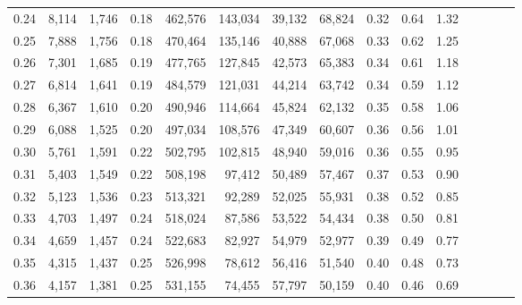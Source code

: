 \begin{tabular}{rrrcrrrrrrrrrrr}
0.24 &   8,114 &  1,746 &                                       0.18 &  462,576 &  143,034 &   39,132 &   68,824 &  0.32 &  0.64 &                         1.32 \\
0.25 &   7,888 &  1,756 &                                       0.18 &  470,464 &  135,146 &   40,888 &   67,068 &  0.33 &  0.62 &                         1.25 \\
0.26 &   7,301 &  1,685 &                                       0.19 &  477,765 &  127,845 &   42,573 &   65,383 &  0.34 &  0.61 &                         1.18 \\
0.27 &   6,814 &  1,641 &                                       0.19 &  484,579 &  121,031 &   44,214 &   63,742 &  0.34 &  0.59 &                         1.12 \\
0.28 &   6,367 &  1,610 &                                       0.20 &  490,946 &  114,664 &   45,824 &   62,132 &  0.35 &  0.58 &                         1.06 \\
0.29 &   6,088 &  1,525 &                                       0.20 &  497,034 &  108,576 &   47,349 &   60,607 &  0.36 &  0.56 &                         1.01 \\
0.30 &   5,761 &  1,591 &                                       0.22 &  502,795 &  102,815 &   48,940 &   59,016 &  0.36 &  0.55 &                         0.95 \\
0.31 &   5,403 &  1,549 &                                       0.22 &  508,198 &   97,412 &   50,489 &   57,467 &  0.37 &  0.53 &                         0.90 \\
0.32 &   5,123 &  1,536 &                                       0.23 &  513,321 &   92,289 &   52,025 &   55,931 &  0.38 &  0.52 &                         0.85 \\
0.33 &   4,703 &  1,497 &                                       0.24 &  518,024 &   87,586 &   53,522 &   54,434 &  0.38 &  0.50 &                         0.81 \\
0.34 &   4,659 &  1,457 &                                       0.24 &  522,683 &   82,927 &   54,979 &   52,977 &  0.39 &  0.49 &                         0.77 \\
0.35 &   4,315 &  1,437 &                                       0.25 &  526,998 &   78,612 &   56,416 &   51,540 &  0.40 &  0.48 &                         0.73 \\
0.36 &   4,157 &  1,381 &                                       0.25 &  531,155 &   74,455 &   57,797 &   50,159 &  0.40 &  0.46 &                         0.69 \\

\end{tabular}
